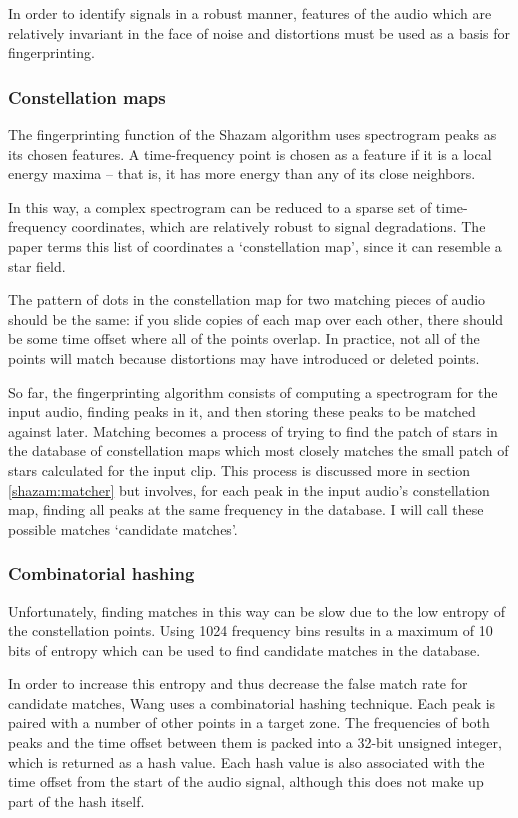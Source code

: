 \documentclass[12pt,a4paper,twoside,openright]{report}
\begin{document}
In order to identify signals in a robust manner, features of the audio which are relatively invariant in the face of noise and distortions must be used as a basis for fingerprinting.

\subsubsection{Constellation maps}

The fingerprinting function of the Shazam algorithm uses spectrogram peaks as its chosen features. A time-frequency point is chosen as a feature if it is a local energy maxima -- that is, it has more energy than any of its close neighbors.

In this way, a complex spectrogram can be reduced to a sparse set of time-frequency coordinates, which are relatively robust to signal degradations. The paper terms this list of coordinates a `constellation map', since it can resemble a star field. 

The pattern of dots in the constellation map for two matching pieces of audio should be the same: if you slide copies of each map over each other, there should be some time offset where all of the points overlap. In practice, not all of the points will match because distortions may have introduced or deleted points.

So far, the fingerprinting algorithm consists of computing a spectrogram for the input audio, finding peaks in it, and then storing these peaks to be matched against later. Matching becomes a process of trying to find the patch of stars in the database of constellation maps which most closely matches the small patch of stars calculated for the input clip. This process is discussed more in section \ref{shazam:matcher} but involves, for each peak in the input audio's constellation map, finding all peaks at the same frequency in the database. I will call these possible matches `candidate matches'.

\subsubsection{Combinatorial hashing}

Unfortunately, finding matches in this way can be slow due to the low entropy of the constellation points. Using 1024 frequency bins results in a maximum of 10 bits of entropy which can be used to find candidate matches in the database. 

In order to increase this entropy and thus decrease the false match rate for candidate matches, Wang uses a combinatorial hashing technique. Each peak is paired with a number of other points in a target zone. The frequencies of both peaks and the time offset between them is packed into a 32-bit unsigned integer, which is returned as a hash value. Each hash value is also associated with the time offset from the start of the audio signal, although this does not make up part of the hash itself.
\end{document}
